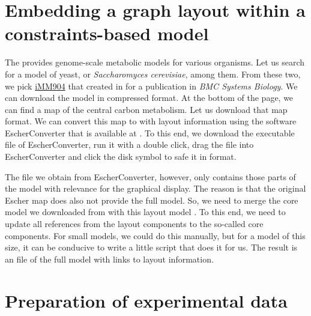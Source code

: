 \section{Embedding a graph layout within a constraints-based model}

The \BiGG provides genome-scale metabolic models for various organisms.
Let us search for a model of yeast, or \emph{Saccharomyces cerevisiae}, among them.
From these two, we pick \href{https://identifiers.org/bigg.model/iMM904}{iMM904} that \citeauthor{Mo2009} created in \citeyear{Mo2009} for a publication in \emph{BMC Systems Biology}.
We can download the model in compressed \SBML format.
At the bottom of the page, we can find a map of the central carbon metabolism.
Let us download that map \JSON format.
We can convert this map to \SBML with layout information using the software EscherConverter \citep{King2015a} that is available at .
To this end, we download the executable \JAR file of EscherConverter, run it with a double click, drag the \JSON file into EscherConverter and click the disk symbol to safe it in \SBML format.

The \SBML file we obtain from EscherConverter, however, only contains those parts of the model with relevance for the graphical display.
The reason is that the original Escher map does also not provide the full model.
So, we need to merge the core model we downloaded from \BiGG with this \SBML layout model \citep{Gauges2015}.
To this end, we need to update all references from the layout components to the so-called \SBML core components.
For small models, we could do this manually, but for a model of this size, it can be conducive to write a little script that does it for us.
The result is an \SBML file of the full model with links to layout information.

\section{Preparation of experimental data}

